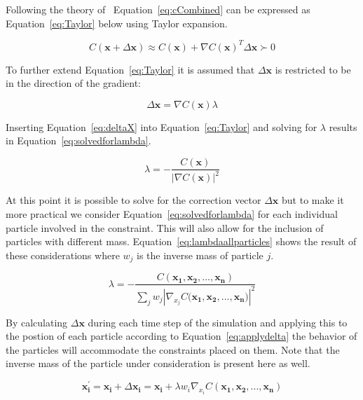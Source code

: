 Following the theory of~\cite{macklin2013position} Equation~\ref{eq:cCombined}
can be expressed as Equation~\ref{eq:Taylor} below using Taylor expansion.

\begin{equation}
\label{eq:Taylor}
C(\mathbf{x} + \Delta \mathbf{x}) \approx C(\mathbf{x}) + \nabla C(\mathbf{x})^{T} \Delta \mathbf{x} \succ 0
\end{equation}

To further extend Equation~\ref{eq:Taylor} it is assumed that $ \Delta
\mathbf{x} $ is restricted to be in the direction of the gradient:

\begin{equation}
\label{eq:deltaX}
\Delta \mathbf{x} = \nabla C(\mathbf{x}) \lambda
\end{equation}

Inserting Equation~\ref{eq:deltaX} into Equation~\ref{eq:Taylor} and solving for $ \lambda $ results in Equation~\ref{eq:solvedforlambda}.

\begin{equation}
\label{eq:solvedforlambda}
\lambda = - \frac{C(\mathbf{x})}{\left | \nabla C(\mathbf{x}) \right |^2}
\end{equation}

At this point it is possible to solve for the correction vector $ \Delta
\mathbf{x} $ but to make it more practical we consider
Equation~\ref{eq:solvedforlambda} for each individual particle involved in the
constraint. This will also allow for the inclusion of particles with different
mass. Equation~\ref{eq:lambdaallparticles} shows the result of these
considerations where $ w_{j} $ is the inverse mass of particle $ j $.

\begin{equation}
\label{eq:lambdaallparticles}
\lambda = - \frac{C(\mathbf{x_{1}}, \mathbf{x_{2}}, ..., \mathbf{x_{n}})}{\sum_{j} w_{j} \left | \nabla_{x_{j}} C(\mathbf{x_{1}, \mathbf{x_{2}}, ..., \mathbf{x_{n}})} \right |^2}
\end{equation}

By calculating $ \Delta \mathbf{x} $ during each time step of the simulation
and applying this to the postion of each particle according to
Equation~\ref{eq:applydelta} the behavior of the particles will accommodate the
constraints placed on them. Note that the inverse mass of the particle under
consideration is present here as well.

\begin{equation}
\label{eq:applydelta}
\mathbf{x_{i}^{'}} = \mathbf{x_{i}} + \Delta \mathbf{x_{i}} = \mathbf{x_{i}} + \lambda w_{i} \nabla_{x_{i}} C(\mathbf{x_{1}}, \mathbf{x_{2}}, ..., \mathbf{x_{n}})
\end{equation}

